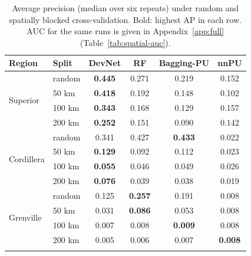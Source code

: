 \documentclass[pdflatex,sn-apa]{sn-jnl}
\begin{document}
\begin{table}[t]
\caption{Average precision (median over six repeats) under random and spatially blocked cross-validation. Bold: highest AP in each row. AUC for the same runs is given in Appendix~\ref{app:full} (Table~\ref{tab:spatial-auc}).}\label{tab:spatial}
\footnotesize
\setlength{\tabcolsep}{3pt}
\begin{tabular*}{\textwidth}{@{\extracolsep\fill}llcccc}
\toprule
Region & Split & DevNet & RF & Bagging-PU & nnPU \\
\midrule
\multirow{4}{*}{Superior} & random & \textbf{0.445} & 0.271 & 0.219 & 0.152 \\
 & 50 km & \textbf{0.418} & 0.192 & 0.148 & 0.102 \\
 & 100 km & \textbf{0.343} & 0.168 & 0.129 & 0.157 \\
 & 200 km & \textbf{0.252} & 0.151 & 0.090 & 0.142 \\
\midrule
\multirow{4}{*}{Cordillera} & random & 0.341 & 0.427 & \textbf{0.433} & 0.022 \\
 & 50 km & \textbf{0.129} & 0.092 & 0.112 & 0.023 \\
 & 100 km & \textbf{0.055} & 0.046 & 0.049 & 0.026 \\
 & 200 km & \textbf{0.076} & 0.039 & 0.038 & 0.019 \\
\midrule
\multirow{4}{*}{Grenville} & random & 0.125 & \textbf{0.257} & 0.191 & 0.008 \\
 & 50 km & 0.031 & \textbf{0.086} & 0.053 & 0.008 \\
 & 100 km & 0.007 & 0.008 & \textbf{0.009} & 0.008 \\
 & 200 km & 0.005 & 0.006 & 0.007 & \textbf{0.008} \\
\botrule
\end{tabular*}
\end{table}
\end{document}
